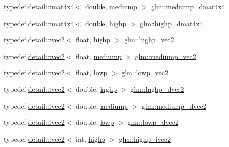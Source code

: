 \begin{DoxyCompactItemize}
typedef \hyperlink{structglm_1_1detail_1_1tmat4x4}{detail\+::tmat4x4}$<$ double, \hyperlink{namespaceglm_a0f04f086094c747d227af4425893f545a6416f3ea0c9025fb21ed50c4d6620482}{mediump} $>$ \hyperlink{group__core__precision_gad64329d45b05417ccf0cc3c23f584d26}{glm\+::mediump\+\_\+dmat4x4}
\item 
typedef \hyperlink{structglm_1_1detail_1_1tmat4x4}{detail\+::tmat4x4}$<$ double, \hyperlink{namespaceglm_a0f04f086094c747d227af4425893f545ac6f7eab42eacbb10d59a58e95e362074}{highp} $>$ \hyperlink{group__core__precision_ga1c0a2edbde597b59e9005691a224b208}{glm\+::highp\+\_\+dmat4x4}
\item 
typedef \hyperlink{structglm_1_1detail_1_1tvec2}{detail\+::tvec2}$<$ float, \hyperlink{namespaceglm_a0f04f086094c747d227af4425893f545ac6f7eab42eacbb10d59a58e95e362074}{highp} $>$ \hyperlink{group__core__precision_ga37645abcfcc1278567e99f1ca492bfbb}{glm\+::highp\+\_\+vec2}
\item 
typedef \hyperlink{structglm_1_1detail_1_1tvec2}{detail\+::tvec2}$<$ float, \hyperlink{namespaceglm_a0f04f086094c747d227af4425893f545a6416f3ea0c9025fb21ed50c4d6620482}{mediump} $>$ \hyperlink{group__core__precision_ga1365858c541931eb8a7473fa85a1d1cf}{glm\+::mediump\+\_\+vec2}
\item 
typedef \hyperlink{structglm_1_1detail_1_1tvec2}{detail\+::tvec2}$<$ float, \hyperlink{namespaceglm_a0f04f086094c747d227af4425893f545ae161af3fc695e696ce3bf69f7332bc2d}{lowp} $>$ \hyperlink{group__core__precision_gac63d79532b7e8d18f579ebe63e4fde49}{glm\+::lowp\+\_\+vec2}
\item 
typedef \hyperlink{structglm_1_1detail_1_1tvec2}{detail\+::tvec2}$<$ double, \hyperlink{namespaceglm_a0f04f086094c747d227af4425893f545ac6f7eab42eacbb10d59a58e95e362074}{highp} $>$ \hyperlink{group__core__precision_gacfbe8512142fff27f0bfb44958c1752f}{glm\+::highp\+\_\+dvec2}
\item 
typedef \hyperlink{structglm_1_1detail_1_1tvec2}{detail\+::tvec2}$<$ double, \hyperlink{namespaceglm_a0f04f086094c747d227af4425893f545a6416f3ea0c9025fb21ed50c4d6620482}{mediump} $>$ \hyperlink{group__core__precision_gace1f1cc2eb8e978dcb60e682af87b541}{glm\+::mediump\+\_\+dvec2}
\item 
typedef \hyperlink{structglm_1_1detail_1_1tvec2}{detail\+::tvec2}$<$ double, \hyperlink{namespaceglm_a0f04f086094c747d227af4425893f545ae161af3fc695e696ce3bf69f7332bc2d}{lowp} $>$ \hyperlink{group__core__precision_ga27a115a27d5f065e8c043f57191d583b}{glm\+::lowp\+\_\+dvec2}
\item 
typedef \hyperlink{structglm_1_1detail_1_1tvec2}{detail\+::tvec2}$<$ int, \hyperlink{namespaceglm_a0f04f086094c747d227af4425893f545ac6f7eab42eacbb10d59a58e95e362074}{highp} $>$ \hyperlink{group__core__precision_gab2bac6095f51f7d7f74747afc2f6747a}{glm\+::highp\+\_\+ivec2}

\end{DoxyCompactItemize}
